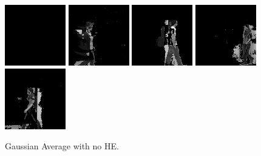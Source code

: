\begin{subfigure}[t]{0.9\textwidth}
    \centering
    \includegraphics[scale=0.7]{figures/LASIESTA-PLAIN-GAUSSIAN/frame0}
    \hfill
    \includegraphics[scale=0.7]{figures/LASIESTA-PLAIN-GAUSSIAN/frame100}
    \hfill
    \includegraphics[scale=0.7]{figures/LASIESTA-PLAIN-GAUSSIAN/frame190}
    \hfill
    \includegraphics[scale=0.7]{figures/LASIESTA-PLAIN-GAUSSIAN/frame250}
    \hfill
    \includegraphics[scale=0.7]{figures/LASIESTA-PLAIN-GAUSSIAN/frame270}
    \caption{Gaussian Average with no HE.}
\end{subfigure}%
\\ \bigskip
